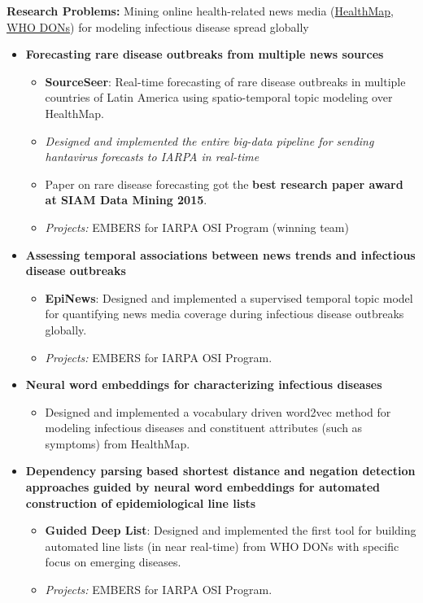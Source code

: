 \par{\textbf{Research Problems:} Mining online health-related news media (\href{http://www.healthmap.org/en/}{HealthMap}, 
                                 \href{http://www.who.int/csr/don/en/}{WHO DONs}) 
                                 for modeling infectious disease spread globally\vspace{0.5em}
\begin{itemize}
 \item  \textbf{Forecasting rare disease outbreaks from multiple news sources}
   \begin{itemize}
     \item {\textbf{SourceSeer}}: Real-time forecasting of rare disease outbreaks in multiple countries of Latin America 
       using spatio-temporal topic modeling over HealthMap.
     \item \textit{Designed and implemented the entire big-data pipeline for sending hantavirus forecasts to IARPA in real-time} 
     \item Paper on rare disease forecasting got the \textbf{best research paper award at SIAM Data Mining 2015}.
     \item \textit{Projects:} EMBERS for IARPA OSI Program (winning team)
   \end{itemize}\vspace{0.25em}
 \item \textbf{Assessing temporal associations between news trends and infectious disease outbreaks}
   \begin{itemize}
     \item {\textbf{EpiNews}}: Designed and implemented a supervised temporal topic
       model for quantifying news media coverage during infectious disease outbreaks globally.
     \item \textit{Projects:} EMBERS for IARPA OSI Program.
   \end{itemize}\vspace{0.25em}
 \item \textbf{Neural word embeddings for characterizing infectious diseases}
   \begin{itemize}
     \item Designed and implemented a vocabulary driven word2vec method for modeling infectious diseases and constituent attributes (such as symptoms)
           from HealthMap.
   \end{itemize}
 \item \textbf{Dependency parsing based shortest distance and negation detection approaches guided by neural word embeddings for automated construction of epidemiological line lists}
   \begin{itemize}
     \item {\textbf{Guided Deep List}}: Designed and implemented the first tool for building automated line lists (in near real-time) from
       WHO DONs with specific focus on emerging diseases.
     \item \textit{Projects:} EMBERS for IARPA OSI Program.
   \end{itemize}
\end{itemize}
}
